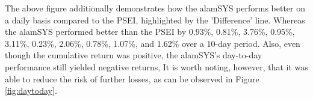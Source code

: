 The above figure additionally demonstrates how the alamSYS performs better 
on a daily basis compared to the PSEI, highlighted by the 'Difference' line.  
Whereas the alamSYS performed better than the PSEI by 0.93\%, 0.81\%, 3.76\%, 
0.95\%, 3.11\%, 0.23\%, 2.06\%, 0.78\%, 1.07\%, and 1.62\% over a 10-day 
period. Also, even though the cumulative return was positive, 
the alamSYS's day-to-day performance still yielded negative returns, 
It is worth noting, however, that it was able to reduce the risk of further 
losses, as can be observed in Figure \ref{fig:daytoday}.


